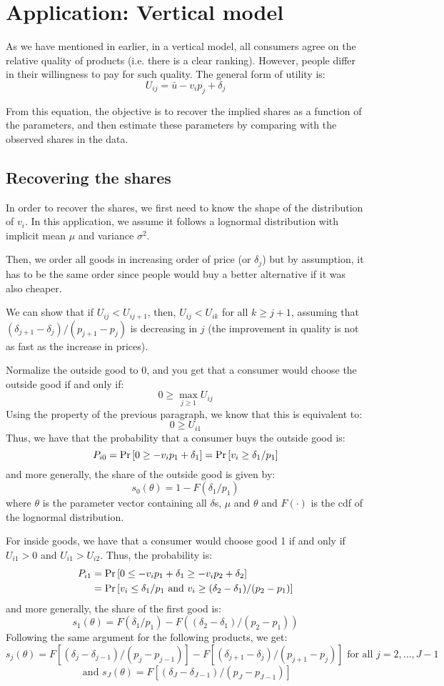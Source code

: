 \section{Application: Vertical model}

As we have mentioned in earlier, in a vertical model, all consumers agree on the relative quality of products (i.e. there is a clear ranking). However, people differ in their willingness to pay for such quality. The general form of utility is: $$U_{ij} = \bar u - v_i p_j + \delta_j $$

From this equation, the objective is to recover the implied shares as a function of the parameters, and then estimate these parameters by comparing with the observed shares in the data.

\subsection{Recovering the shares}

In order to recover the shares, we first need to know the shape of the distribution of $v_i$. In this application, we assume it follows a lognormal distribution with implicit mean $\mu$ and variance $\sigma^2$. 

Then, we order all goods in increasing order of price (or $\delta_j$) but by assumption, it has to be the same order since people would buy a better alternative if it was also cheaper.

We can show that if $U_{ij} < U_{ij+1}$, then, $U_{ij} < U_{ik}$ for all $k \geq j+1$, assuming that $(\delta_{j+1} - \delta_j)/(p_{j+1} - p_j)$ is decreasing in $j$ (the improvement in quality is not as fast as the increase in prices).

Normalize the outside good to 0, and you get that a consumer would choose the outside good if and only if: $$ 0 \geq \max_{j\geq 1} U_{ij} $$ Using the property of the previous paragraph, we know that this is equivalent to: $$ 0 \geq U_{i1} $$ Thus, we have that the probability that a consumer buys the outside good is: $$ P_{i0} = \operatorname{Pr}\left[0 \geq -v_ip_1 + \delta_1\right] = \operatorname{Pr}\left[v_i \geq \delta_1/p_1\right] $$ and more generally, the share of the outside good is given by: $$ s_0(\theta) = 1 - F(\delta_1/p_1) $$ where $\theta$ is the parameter vector containing all $\delta$s, $\mu$ and $\theta$ and $F(\cdot)$ is the cdf of the lognormal distribution.

For inside goods, we have that a consumer would choose good 1 if and only if $U_{i1} > 0$ and $U_{i1} > U_{i2}$. Thus, the probability is: \begin{align*}
P_{i1} & = \operatorname{Pr}\left[0 \leq -v_ip_1 + \delta_1 \geq -v_ip_2 + \delta_2\right] \\ & = \operatorname{Pr}\left[v_i \leq \delta_1/p_1 \text{ and } v_i \geq (\delta_2 - \delta_1)/(p_2 - p_1) \right]
\end{align*}
and more generally, the share of the first good is: $$s_1(\theta) = F(\delta_1/p_1) - F((\delta_2 - \delta_1)/(p_2 - p_1)) $$
Following the same argument for the following products, we get: $$ s_j(\theta) = F[(\delta_j - \delta_{j-1})/(p_j - p_{j-1})] - F[(\delta_{j+1} - \delta_j)/(p_{j+1} - p_j)] \text{ for all } j=2, ..., J-1 $$
$$ \text{ and } s_J(\theta) = F[(\delta_J - \delta_{J-1})/(p_J - p_{J-1})] $$

